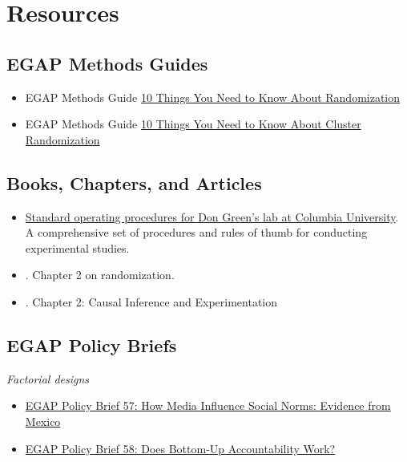\documentclass[12pt,]{book}
\begin{document}
\hypertarget{resources-2}{%
\section{Resources}\label{resources-2}}

\hypertarget{egap-methods-guides-2}{%
\subsection{EGAP Methods Guides}\label{egap-methods-guides-2}}

\begin{itemize}
\item
  EGAP Methods Guide \href{https://egap.org/resource/10-things-to-know-about-randomization/}{10 Things You Need to Know About Randomization}
\item
  EGAP Methods Guide \href{https://egap.org/resource/10-things-to-know-about-cluster-randomization/}{10 Things You Need to Know About Cluster Randomization}
\end{itemize}

\hypertarget{books-chapters-and-articles-1}{%
\subsection{Books, Chapters, and Articles}\label{books-chapters-and-articles-1}}

\begin{itemize}
\item
  \href{https://github.com/acoppock/Green-Lab-SOP}{Standard operating procedures for Don Green's lab at Columbia University}. A comprehensive set of procedures and rules of thumb for conducting experimental studies.
\item
  \autocite{glennerster_running_2013}. Chapter 2 on randomization.
\item
  \autocite{gerber_field_2012}. Chapter 2: Causal Inference and Experimentation
\end{itemize}

\hypertarget{egap-policy-briefs-1}{%
\subsection{EGAP Policy Briefs}\label{egap-policy-briefs-1}}

\emph{Factorial designs}

\begin{itemize}
\item
  \href{https://egap.org/resource/how-media-influence-social-norms-evidence-from-mexico/}{EGAP Policy Brief 57: How Media Influence Social Norms: Evidence from Mexico}
\item
  \href{https://egap.org/resource/does-bottom-up-accountability-work-evidence-from-uganda/}{EGAP Policy Brief 58: Does Bottom-Up Accountability Work?}
\end{itemize}
\end{document}
